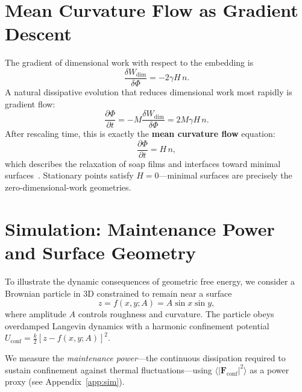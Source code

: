\documentclass[aps,pre,twocolumn,superscriptaddress,floatfix]{revtex4-2}
\begin{document}
\section{Mean Curvature Flow as Gradient Descent}

The gradient of dimensional work with respect to the embedding is
\begin{equation}
\frac{\delta W_{\mathrm{dim}}}{\delta \Phi} = -2\gamma H \, n.
\end{equation}
A natural dissipative evolution that reduces dimensional work most rapidly is gradient flow:
\begin{equation}
\frac{\partial \Phi}{\partial t} = -M \frac{\delta W_{\mathrm{dim}}}{\delta \Phi} = 2M\gamma H\, n.
\end{equation}
After rescaling time, this is exactly the \textbf{mean curvature flow} equation:
\begin{equation}
\frac{\partial \Phi}{\partial t} = H\, n,
\end{equation}
which describes the relaxation of soap films and interfaces toward minimal surfaces~\cite{brakke1978}. Stationary points satisfy $H = 0$---minimal surfaces are precisely the zero-dimensional-work geometries.

\section{Simulation: Maintenance Power and Surface Geometry}

To illustrate the dynamic consequences of geometric free energy, we consider a Brownian particle in 3D constrained to remain near a surface
\begin{equation}
z = f(x,y; A) = A \sin x \sin y,
\end{equation}
where amplitude $A$ controls roughness and curvature. The particle obeys overdamped Langevin dynamics with a harmonic confinement potential $U_{\mathrm{conf}} = \frac{k}{2}[z - f(x,y;A)]^2$.

We measure the \emph{maintenance power}---the continuous dissipation required to sustain confinement against thermal fluctuations---using $\langle|\mathbf{F}_{\mathrm{conf}}|^2\rangle$ as a power proxy (see Appendix~\ref{app:sim}).
\end{document}

